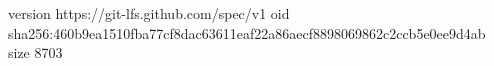 version https://git-lfs.github.com/spec/v1
oid sha256:460b9ea1510fba77cf8dac63611eaf22a86aecf8898069862c2ccb5e0ee9d4ab
size 8703

